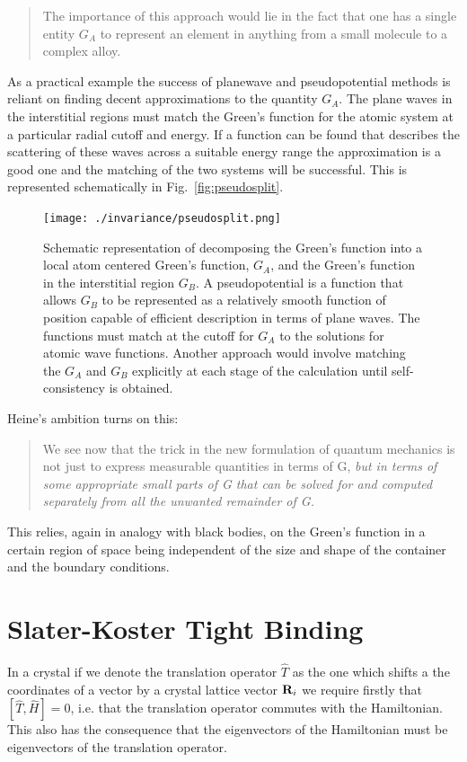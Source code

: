 \begin{quote}
The importance of this approach would lie in the fact that
one has a single entity $G_{A}$ to represent an element in anything 
from a small molecule to a complex alloy.
\end{quote}

As a practical example the success of planewave and pseudopotential methods 
is reliant on finding decent approximations to the quantity $G_{A}$. The plane waves
in the interstitial regions must match the Green's function for the atomic system
at a particular radial cutoff and energy. If a function can be found that 
describes the scattering of these waves across a suitable energy range the approximation 
is a good one and the matching of the two systems will be successful. This
is represented schematically in Fig.~\ref{fig:pseudosplit}.
%
\begin{figure}
\begin{center}
\texttt{[image: ./invariance/pseudosplit.png]}
\caption{Schematic representation of decomposing the Green's function into a local atom centered
Green's function, $G_{A}$, and the Green's function in the interstitial region $G_{B}$.
A pseudopotential is a function that allows $G_{B}$ to be represented as a relatively
smooth function of position capable of efficient description in terms of plane waves.
The functions must match at the cutoff for $G_{A}$ to the solutions for 
atomic wave functions. Another approach would involve matching the $G_{A}$ 
and $G_{B}$ explicitly at each stage of the calculation until self-consistency is obtained.}
\end{center}
\end{figure}
%
Heine's ambition turns on this:
%
\begin{quote}
We see now that the trick in the new formulation of quantum 
mechanics is not just to express measurable quantities in terms of 
G, {\it but in terms of some appropriate small parts of G that can be solved 
for and computed separately from all the unwanted remainder of G.}
\end{quote}
%
This relies, again in analogy with black bodies, on the Green's
function in a certain region of space being independent of the size and shape
of the container and the boundary conditions.

\section{Slater-Koster Tight Binding}
  In a crystal if we denote the translation operator $\hat{T}$
as the one which shifts a the coordinates of a vector by a crystal lattice vector 
${\bf R}_{i}$ we require firstly that $[\hat{T},\hat{H}]=0$, i.e. that the 
translation operator commutes with the Hamiltonian. This also
has the consequence that the eigenvectors of the Hamiltonian
must be eigenvectors of the translation operator. 

